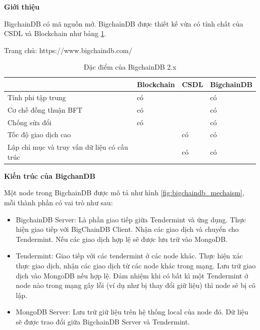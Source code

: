 \textbf{Giới thiệu}

BigchainDB có mã nguồn mở.
BigchainDB được thiết kế vừa có tính chất của CSDL và Blockchain như bảng \ref{table:bigchaindb}.

Trang chủ: https://www.bigchaindb.com/

\begin{table}[H]
\caption{Đặc điểm của BigchainDB 2.x}
	\label{table:bigchaindb}
	\begin{tabularx} {\textwidth} {|X|p{2.2cm}|p{2.2cm}|p{2.2cm}|}
\hline
	 & Blockchain & CSDL & BigchainDB \\ \hline
	Tính phi tập trung & có &   & có \\ \hline
	Cơ chế đồng thuận BFT   & có  &   & có \\ \hline
	Chống sửa đổi  & có  &   & có \\ \hline
	Tốc độ giao dịch cao &  & có  & có \\ \hline
	Lập chỉ mục và truy vấn dữ liệu có cấu trúc   &   & có & có \\ \hline
\end{tabularx}
\end{table}

\textbf{Kiến trúc của BigchanDB}

Một node trong BigchainDB được mô tả như hình \ref{fig:bigchaindb_mechaism}, mỗi thành phần có vai trò như sau:

\begin{itemize}
	\item BigchainDB Server: Là phần giao tiếp giữa Tendermint và ứng dụng.
Thực hiện giao tiếp với BigChainDB Client.
Nhận các giao dịch và chuyển cho Tendermint.
Nếu các giao dịch hợp lệ sẽ được lưu trữ vào MongoDB.
	\item Tendermint: Giao tiếp với các tendermint ở các node khác.
Thực hiện xác thực giao dịch, nhận các giao dịch từ các node khác trong mạng.
Lưu trữ giao dịch vào MongoDB nếu hợp lệ.
Đảm nhiệm khi có bất kì một Tendermint ở node nào trong mạng gây lỗi (ví dụ như bị thay đổi giữ liệu) thì node sẽ bị cô lập.
	\item MongoDB Server: Lưu trữ giữ liệu trên hệ thống local của node đó. Dữ liệu sẽ được trao đổi giữa BigchainDB Server và Tendermint.
\end{itemize}

